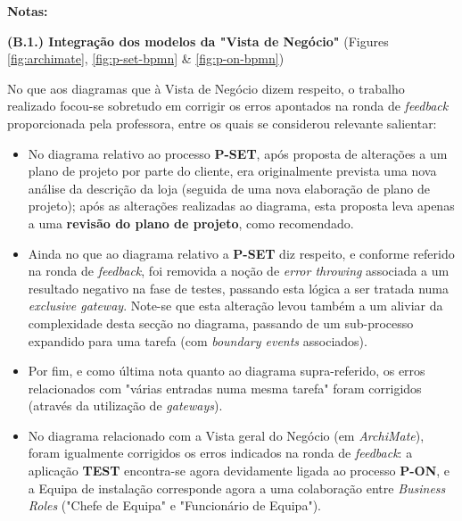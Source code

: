 \documentclass[12pt,a4paper]{article}
\begin{document}
\begin{tcolorbox}[enhanced jigsaw,colback=bg,boxrule=0pt,arc=4pt]
  \begin{large}
    \textbf{Notas:}
  \end{large}

  \begin{small}
    \textbf{(B.1.) Integração dos modelos da "Vista de Negócio"} (Figures \ref{fig:archimate}, \ref{fig:p-set-bpmn} \& \ref{fig:p-on-bpmn})
  \end{small}

  No que aos diagramas que à Vista de Negócio dizem respeito, o trabalho realizado focou-se
  sobretudo em corrigir os erros apontados na ronda de \textit{feedback} proporcionada
  pela professora, entre os quais se considerou relevante salientar:
  \begin{itemize}
    \item No diagrama relativo ao processo \textbf{P-SET}, após proposta de alterações a um
          plano de projeto por parte do cliente, era originalmente prevista uma nova análise da
          descrição da loja (seguida de uma nova elaboração de plano de projeto); após as alterações
          realizadas ao diagrama, esta proposta leva apenas a uma \textbf{revisão do plano de projeto},
          como recomendado.
    \item Ainda no que ao diagrama relativo a \textbf{P-SET} diz respeito, e conforme referido
          na ronda de \textit{feedback}, foi removida a noção de \textit{error throwing} associada a um
          resultado negativo na fase de testes, passando esta lógica a ser tratada numa \textit{exclusive
            gateway}. Note-se que esta alteração levou também a um aliviar da complexidade desta secção
          no diagrama, passando de um sub-processo expandido para uma tarefa (com \textit{boundary events} associados).
    \item Por fim, e como última nota quanto ao diagrama supra-referido, os erros relacionados com "várias entradas
          numa mesma tarefa" foram corrigidos (através da utilização de \textit{gateways}).
    \item No diagrama relacionado com a Vista geral do Negócio (em \textit{ArchiMate}),
          foram igualmente corrigidos os erros indicados na ronda de \textit{feedback}: a aplicação
          \textbf{TEST} encontra-se agora devidamente ligada ao processo \textbf{P-ON}, e a Equipa de instalação
          corresponde agora a uma colaboração entre \textit{Business Roles} ("Chefe de Equipa"
          e "Funcionário de Equipa").
  \end{itemize}


\end{tcolorbox}
\end{document}
